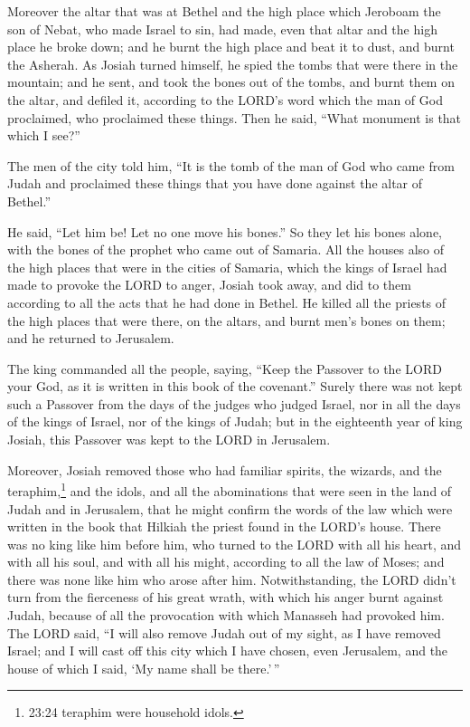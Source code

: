  Moreover the altar that was at Bethel and the high place
which Jeroboam the son of Nebat, who made Israel to sin, had made, even
that altar and the high place he broke down; and he burnt the high place
and beat it to dust, and burnt the Asherah.  As Josiah
turned himself, he spied the tombs that were there in the mountain; and
he sent, and took the bones out of the tombs, and burnt them on the
altar, and defiled it, according to the LORD's word which the man of God
proclaimed, who proclaimed these things.  Then he said,
``What monument is that which I see?''

The men of the city told him, ``It is the tomb of the man of God who
came from Judah and proclaimed these things that you have done against
the altar of Bethel.''

 He said, ``Let him be! Let no one move his bones.'' So
they let his bones alone, with the bones of the prophet who came out of
Samaria.  All the houses also of the high places that were
in the cities of Samaria, which the kings of Israel had made to provoke
the LORD to anger, Josiah took away, and did to them according to all
the acts that he had done in Bethel.  He killed all the
priests of the high places that were there, on the altars, and burnt
men's bones on them; and he returned to Jerusalem.

 The king commanded all the people, saying, ``Keep the
Passover to the LORD your God, as it is written in this book of the
covenant.''  Surely there was not kept such a Passover from
the days of the judges who judged Israel, nor in all the days of the
kings of Israel, nor of the kings of Judah;  but in the
eighteenth year of king Josiah, this Passover was kept to the LORD in
Jerusalem.

 Moreover, Josiah removed those who had familiar spirits,
the wizards, and the teraphim,\footnote{23:24 teraphim were household
  idols.} and the idols, and all the abominations that were seen in the
land of Judah and in Jerusalem, that he might confirm the words of the
law which were written in the book that Hilkiah the priest found in the
LORD's house.  There was no king like him before him, who
turned to the LORD with all his heart, and with all his soul, and with
all his might, according to all the law of Moses; and there was none
like him who arose after him.  Notwithstanding, the LORD
didn't turn from the fierceness of his great wrath, with which his anger
burnt against Judah, because of all the provocation with which Manasseh
had provoked him.  The LORD said, ``I will also remove
Judah out of my sight, as I have removed Israel; and I will cast off
this city which I have chosen, even Jerusalem, and the house of which I
said, `My name shall be there.'\,''

